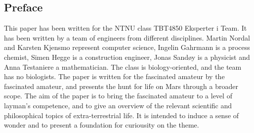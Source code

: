 \subsection*{Preface}

This paper has been written for the NTNU class TBT4850 Eksperter i Team. It has been written by a team of engineers from different disciplines. Martin Nordal and Karsten Kjensmo represent computer science, Ingelin Gahrmann is a process chemist, Simen Hegge is a construction engineer, Jonas Sandøy is a physicist and Anna Testaniere a mathematician. The class is biology-oriented, and the team has no biologists. The paper is written for the fascinated amateur by the fascinated amateur, and presents the hunt for life on Mars through a broader scope. The aim of the paper is to bring the fascinated amateur to a level of layman's competence, and to give an overview of the relevant scientific and philosophical topics of extra-terrestrial life. It is intended to induce a sense of wonder and to present a foundation for curiousity on the theme.


